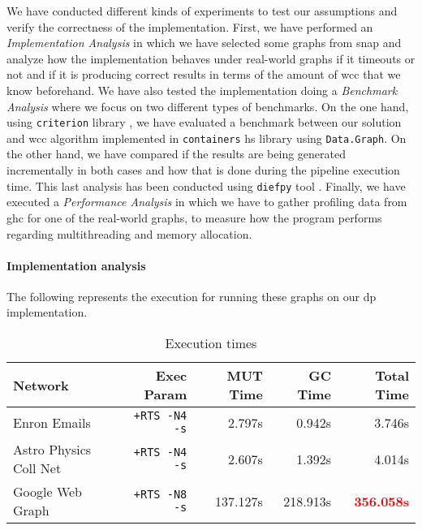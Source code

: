 We have conducted different kinds of experiments to test our assumptions and verify the correctness of the implementation.
First, we have performed an \emph{Implementation Analysis} in which we have selected some graphs from \acrfull{snap} \cite{stanford} 
and analyze how the implementation behaves under real-world graphs if it timeouts or not and if it is producing correct results in terms of the amount of \acrshort{wcc} that we know beforehand.
We have also tested the implementation doing a \emph{Benchmark Analysis} where we focus on two different types of benchmarks. On the one hand, 
using \texttt{criterion} library \cite{criterion}, we have evaluated a benchmark between our solution and \acrshort{wcc} algorithm implemented in \texttt{containers} \acrshort{hs} library \cite{containers} 
using \texttt{Data.Graph}. On the other hand, we have compared if the results are being generated incrementally in both cases and how that is done during the pipeline execution time. 
This last analysis has been conducted using \texttt{diefpy} tool \cite{diefpaper,diefpy}.
Finally, we have executed a \textit{Performance Analysis} in which we have to gather profiling data from \acrfull{ghc} for one of the real-world graphs, to measure how the program performs 
regarding multithreading and memory allocation.

\paragraph{Implementation analysis} The following represents the execution for running these graphs on our \acrshort{dp} implementation.

\begin{table}[H]
  \centering
  \begin{tabular}{|l|r|r|r|r|}
   \hline
   \textbf{Network} & \textbf{Exec Param} & \textbf{MUT Time} & \textbf{GC Time} & \textbf{Total Time}\\
   \hline
   Enron Emails & \texttt{+RTS -N4 -s} & 2.797s & 0.942s & 3.746s \\
   \hline
   Astro Physics Coll Net & \texttt{+RTS -N4 -s} & 2.607s & 1.392s & 4.014s \\
   \hline
   Google Web Graph & \texttt{+RTS -N8 -s} & 137.127s & 218.913s & \textbf{\textcolor{red}{356.058s}} \\
   \hline
  \end{tabular}
 \caption{Execution times}
 \label{table:5}
 \end{table}

